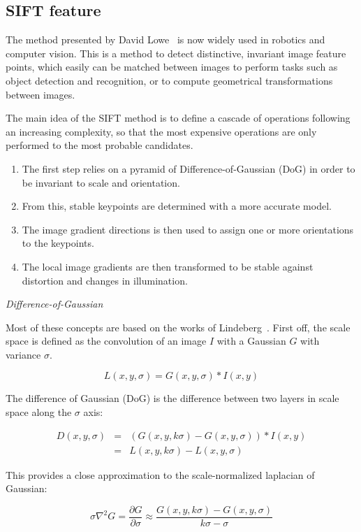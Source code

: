 \subsection{SIFT feature}

The method presented by David Lowe~\cite{lowe_2004_sift} is now widely used in robotics and computer vision.
This is a method to detect distinctive, invariant image feature points, which easily can be matched between images to perform tasks such as object detection and recognition, or to compute geometrical transformations between images.

The main idea of the SIFT method is to define a cascade of operations following an increasing complexity, so that the most expensive operations are only performed to the most probable candidates.
\begin{enumerate}
\item The first step relies on a pyramid of Difference-of-Gaussian (DoG) in order to be invariant to scale and orientation.
\item From this, stable  keypoints are determined with a more accurate model.
\item The image gradient directions is then used to assign one or more orientations to the keypoints.
\item The local image gradients are then transformed to be stable against distortion and changes in illumination.
\end{enumerate}

\emph{Difference-of-Gaussian}

Most of these concepts are based on the works of Lindeberg~\cite{Lindeberg_1994}. First off, the scale space is defined as the convolution of an image $I$ with a Gaussian $G$ with variance $\sigma$.

\[ L(x,y,\sigma) = G(x,y,\sigma) * I(x,y) \]

The difference of Gaussian (DoG) is the difference between two layers in scale space along the $\sigma$ axis:

\[
\begin{array}{rcl}
D(x,y,\sigma) & = & (G(x,y, k\sigma) - G(x,y,\sigma)) * I(x,y) \\
 & = & L(x,y,k\sigma) - L(x,y,\sigma)
\end{array}
\] 

This provides a close approximation to the scale-normalized laplacian of Gaussian:

\[ \sigma\nabla^2G = \frac{\partial G}{\partial \sigma} \approx \frac{G(x,y,k\sigma)-G(x,y,\sigma)}{k\sigma - \sigma} \]

